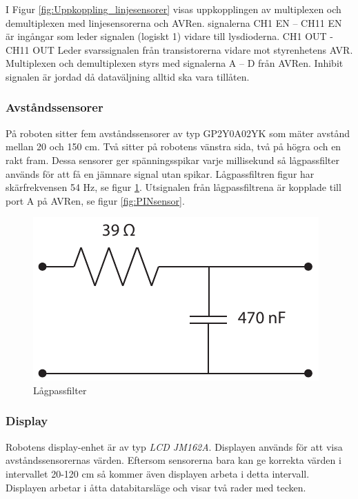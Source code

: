 I Figur \ref{fig:Uppkoppling_linjesensorer} visas uppkopplingen av multiplexen och
demultiplexen  med linjesensorerna och AVRen. signalerna CH1 EN – CH11 EN 
är ingångar som leder signalen (logiskt 1) vidare till lysdioderna. 
CH1  OUT - CH11 OUT Leder svarssignalen från transistorerna vidare mot styrenhetens 
AVR. Multiplexen och demultiplexen styrs med signalerna A – D från AVRen. Inhibit 
signalen är jordad då dataväljning alltid ska vara tillåten.


\subsubsection{Avståndssensorer}
På roboten sitter fem avståndssensorer av typ GP2Y0A02YK som mäter avstånd
mellan 20 och 150 cm. Två sitter på robotens vänstra sida, två på högra och en
rakt fram. Dessa sensorer ger spänningsspikar varje millisekund så lågpassfilter
används för att få en jämnare signal utan spikar. Lågpassfiltren figur
har skärfrekvensen 54 Hz, se figur \ref{fig:lagpassfilter}. Utsignalen från
lågpassfiltrena är kopplade till port A på AVRen, se figur \ref{fig:PINsensor}.

\begin{figure}[H]
  \centering
 \includegraphics[angle=0,scale=0.7]{bilder/LPfilter.pdf}
  \caption{Lågpassfilter}
  \label{fig:lagpassfilter}
\end{figure}



\subsubsection{Display}
Robotens display-enhet är av typ \emph{LCD JM162A}. Displayen används för att 
visa avståndssensorernas värden. Eftersom sensorerna bara kan ge korrekta 
värden i intervallet 20-120 cm så kommer även displayen arbeta i detta 
intervall. Displayen arbetar i åtta databitarsläge och visar två rader med 
tecken. 

